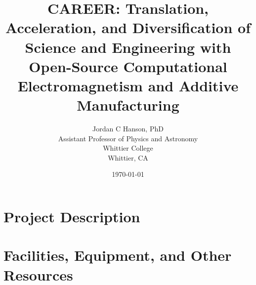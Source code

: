 \documentclass[10pt,twoside,openany]{book}
\title{CAREER: Translation, Acceleration, and Diversification of Science and Engineering with Open-Source Computational Electromagnetism and Additive Manufacturing}
\author{Jordan C Hanson, PhD \\ Assistant Professor of Physics and Astronomy \\ Whittier College \\ Whittier, CA}
\date{\today}
\begin{document}
\begin{flushleft}

\end{flushleft}

\begin{flushleft}

\end{flushleft}

\maketitle
\tableofcontents
\thispagestyle{empty}

\chapter{Project Description}
\thispagestyle{empty}
\begin{flushleft}

\end{flushleft}

\chapter{Facilities, Equipment, and Other Resources}
\thispagestyle{empty}
\begin{flushleft}

\end{flushleft}

\small


 
\end{document}
